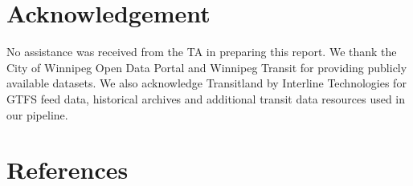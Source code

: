 \documentclass[11pt]{article}
\begin{document}
\section*{Acknowledgement}
No assistance was received from the TA in preparing this report. We thank the City of Winnipeg Open Data Portal and Winnipeg Transit for providing publicly available datasets. We also acknowledge Transitland by Interline Technologies for GTFS feed data, historical archives and additional transit data resources used in our pipeline.

\section*{References}
\end{document}
